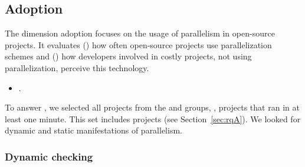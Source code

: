 



\subsection{Adoption}
\label{sec:rqC}
\label{sec:rqE}

The dimension adoption focuses on the usage of parallelism in
open-source projects.  It evaluates (\numRQAdoptionOne) how often open-source
projects use parallelization schemes and (\numRQSpeedupOne) how developers
involved in costly projects, not using parallelization, perceive this
technology.

\begin{itemize}
    \item \numRQAdoptionOne. \textbf{\RQAdoptionOne{}}
\end{itemize}

To answer \numRQAdoptionOne{}, we selected all projects from the \medg{} and
\longg{} groups, \ie, projects that ran in at least one minute.  This
set includes \numMedLong{} projects (see Section~\ref{sec:rqA}).  We
looked for dynamic and static manifestations of parallelism.


\vspace{1ex}
\subsubsection{Dynamic checking}
\label{sec:rqC-1}

